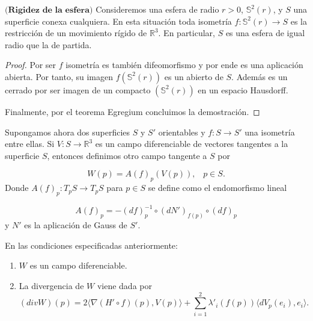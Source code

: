 \begin{teorema}
	$\textbf{(Rigidez de la esfera)}$ Consideremos una esfera de radio $r>0$, $\mathbb{S}^2(r)$, y $S$ una superficie conexa cualquiera. En esta situación toda isometría $f : \mathbb{S}^2(r) \to S$ es la restricción de un movimiento rígido de $\mathbb{R}^3$. En particular, $S$ es una esfera de igual radio que la de partida.
\end{teorema}

\begin{proof}
	Por ser $f$ isometría es también difeomorfismo y por ende es una aplicación abierta. Por tanto, su imagen $f(\mathbb{S}^2(r))$ es un abierto de $S$. Además es un cerrado por ser imagen de un compacto $(\mathbb{S}^2(r))$ en un espacio Hausdorff.
	
	Finalmente, por el teorema Egregium concluimos la demostración.
\end{proof}
	${ }$\\

Supongamos ahora dos superficies $S$ y $S'$ orientables  y $f : S \to S'$ una isometría entre ellas. Si $V : S \to \mathbb{R}^3$ es un campo diferenciable de vectores tangentes a la superficie $S$, entonces definimos otro campo tangente a $S$ por

	\[
		W(p) = A(f)_p(V(p)), \;\;\; p \in S.
	\]
Donde $A(f)_p : T_p S \to T_p S$ para $p \in S$ se define como el endomorfismo lineal

	\[
		A(f)_p = -(df)^{-1}_{p} \circ (dN')_{f(p)} \circ (df)_p
	\]
y $N'$ es la aplicación de Gauss de $S'$.

\begin{lema} \label{lem:lema1}
	En las condiciones especificadas anteriormente:
	\begin{enumerate}
		\item $W$ es un campo diferenciable.
		\item La divergencia de $W$ viene dada por 
		\[
			(div W)(p) = 2 \langle \nabla (H' \circ f)(p), V(p) \rangle + \sum_{i=1}^{2} \lambda'_{i}(f(p)) \langle dV_p(e_i), e_i \rangle.
		\]
	\end{enumerate}
	
\end{lema}


